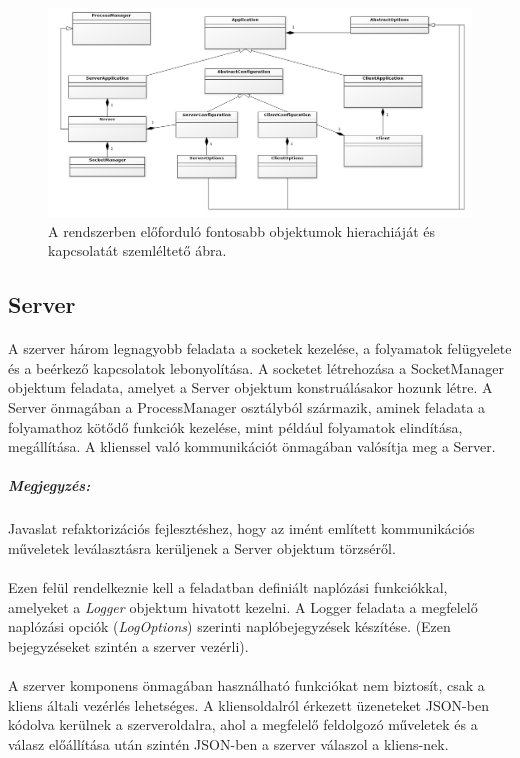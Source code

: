 \documentclass[12pt]{report}
\begin{document}
     \begin{figure}[ht]
    \includegraphics[width=16cm]{pics/classes.png}
	  \caption{A rendszerben előforduló fontosabb objektumok hierachiáját és kapcsolatát szemléltető ábra.}
  \end{figure}
\subsection{Server}
  \paragraph{}
  A szerver három legnagyobb feladata a socketek kezelése, a folyamatok felügyelete és a beérkező kapcsolatok lebonyolítása. A socketet létrehozása a SocketManager objektum feladata, amelyet a Server objektum konstruálásakor hozunk létre. A Server önmagában a ProcessManager osztályból származik, aminek feladata a folyamathoz kötődő funkciók kezelése, mint például folyamatok elindítása, megállítása. A klienssel való kommunikációt önmagában valósítja meg a Server.
  
  \subparagraph{Megjegyzés:}Javaslat refaktorizációs fejlesztéshez, hogy az imént említett kommunikációs műveletek leválasztásra kerüljenek a Server objektum törzséről.
  \paragraph{}
Ezen felül rendelkeznie kell a feladatban definiált naplózási funkciókkal, amelyeket a \textit{Logger} objektum hivatott kezelni. A Logger feladata a megfelelő naplózási opciók (\textit{LogOptions}) szerinti naplóbejegyzések készítése. (Ezen bejegyzéseket szintén  a szerver vezérli).

\paragraph{}
  A szerver komponens önmagában használható funkciókat nem biztosít, csak a kliens általi vezérlés lehetséges. A kliensoldalról érkezett üzeneteket JSON-ben kódolva kerülnek a szerveroldalra, ahol a megfelelő feldolgozó műveletek és a válasz előállítása után szintén JSON-ben a szerver válaszol a kliens-nek.
  
\end{document}
